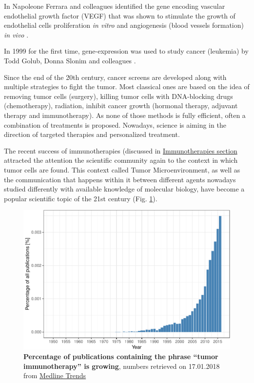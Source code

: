 \documentclass[12pt,]{book}
\theoremstyle{definition}
\theoremstyle{definition}
\theoremstyle{definition}
\theoremstyle{remark}
\begin{document}
In Napoleone Ferrara and colleagues identified the gene encoding
vascular endothelial growth factor (VEGF) that was shown to stimulate
the growth of endothelial cells proliferation \emph{in vitro} and
angiogenesis (blood vessels formation) \emph{in vivo} \citep{Leung1989}.

In 1999 for the first time, gene-expression was used to study cancer
(leukemia) by Todd Golub, Donna Slonim and colleagues \citep{Golub1999}.

Since the end of the 20th century, cancer screens are developed along
with multiple strategies to fight the tumor. Most classical ones are
based on the idea of removing tumor cells (surgery), killing tumor cells
with DNA-blocking drugs (chemotherapy), radiation, inhibit cancer growth
(hormonal therapy, adjuvant therapy and immunotherapy). As none of those
methods is fully efficient, often a combination of treatments is
proposed. Nowadays, science is aiming in the direction of targeted
therapies and personalized treatment.

The recent success of immunotherapies (discussed in
\protect\hyperlink{immunotherapies}{Immunotherapies section} attracted
the attention the scientific community again to the context in which
tumor cells are found. This context called Tumor Microenvironment, as
well as the communication that happens within it between different
agents nowadays studied differently with available knowledge of
molecular biology, have become a popular scientific topic of the 21st
century (Fig. \ref{fig:pubmedTME}).

\begin{figure}

{\centering \includegraphics[width=0.7\linewidth]{UCzPhDThesis_files/figure-latex/pubmedTME-1} 

}

\caption[Percentage of publications containing the phrase "tumor immunotherapy" is growing]{\textbf{Percentage of publications containing
the phrase ``tumor immunotherapy'' is growing}, numbers retrieved on
17.01.2018 from \href{http://dan.corlan.net/medline-trend.html}{Medline
Trends} \citep{Corlan2004}}\label{fig:pubmedTME}
\end{figure}
\end{document}
